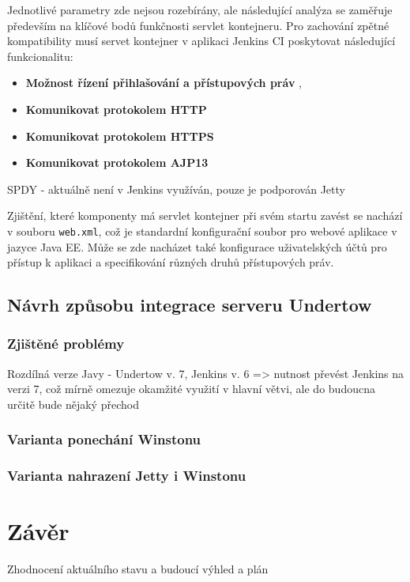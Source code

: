             Jednotlivé parametry zde nejsou rozebírány, ale následující analýza
            se zaměřuje především na klíčové bodů funkčnosti servlet kontejneru.
            Pro zachování zpětné kompatibility musí servet kontejner v aplikaci 
            Jenkins CI poskytovat následující funkcionalitu:

            \begin{itemize}
                \item{\textbf{Možnost řízení přihlašování a přístupových práv} 
                    \cite{securityArchitecture}, \cite{securityArchitectureWinstone}
                    }
                \item{\textbf{Komunikovat protokolem HTTP}}
                \item{\textbf{Komunikovat protokolem HTTPS}}
                \item{\textbf{Komunikovat protokolem AJP13}}
            \end{itemize}
            


        
            SPDY - aktuálně není v Jenkins využíván, pouze je podporován Jetty



            
            Zjištění, které komponenty má servlet kontejner při svém startu zavést
            se nachází v souboru \texttt{web.xml}, což je standardní konfigurační soubor
            pro webové aplikace v jazyce Java EE. Může se zde nacházet také
            konfigurace uživatelských účtů pro přístup k aplikaci a specifikování
            různých druhů přístupových práv.



    \section{Návrh způsobu integrace serveru Undertow}

        \subsection{Zjištěné problémy}
            Rozdílná verze Javy - Undertow v. 7, Jenkins v. 6 => nutnost převést Jenkins na verzi 7,
            což mírně omezuje okamžité využití v hlavní větvi, ale do budoucna určitě bude nějaký přechod

        \subsection{Varianta ponechání Winstonu}

        \subsection{Varianta nahrazení Jetty i Winstonu}





\chapter{Závěr}
    Zhodnocení aktuálního stavu a budoucí výhled a plán





